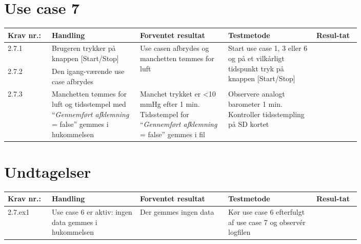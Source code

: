 \section{Use case 7}
						\begin{longtable}{|p{0.1\linewidth}|p{0.2\linewidth}|p{0.2\linewidth}|p{0.2\linewidth}|p{0.1\linewidth}|}
							\hline
							\rowcolor{usDef}
							Krav nr.: & Handling & Forventet resultat & Testmetode & Resul-tat  \\\hline
							2.7.1 & Brugeren trykker på knappen [Start/Stop] & \multirow{2}{\linewidth}{Use casen afbrydes og manchetten tømmes for luft} & \multirow{2}{\linewidth}{Start use case 1, 3 eller 6 og på et vilkårligt tidspunkt tryk på knappen [Start/Stop]} & \multirow{2}{\linewidth}{} \\ \cline{1-2}
							2.7.2 & Den igang-værende use case afbrydes & & & \\ \hline
							2.7.3 & Manchetten tømmes for luft og tidsstempel med “\textit{Gennemført afklemning} = false” gemmes i hukommelsen & Manchet trykket er \textless 10 mmHg efter 1 min. Tidsstempel for  “\textit{Gennemført afklemning} = false” gemmes i fil & Observere analogt barometer 1 min.
							Kontroller tidsstempling på SD kortet & \\ \hline
						\end{longtable}
						
						\pagebreak
					
					\section*{Undtagelser}
						\begin{longtable}{|p{0.1\linewidth}|p{0.2\linewidth}|p{0.2\linewidth}|p{0.2\linewidth}|p{0.1\linewidth}|}
							\hline
							\rowcolor{usDef}
							Krav nr.: & Handling & Forventet resultat & Testmetode & Resul-tat  \\\hline
							2.7.ex1 & Use case 6 er aktiv: ingen data gemmes i hukommelsen & Der gemmes ingen data & Kør use case 6 efterfulgt af use case 7 og observér logfilen & \\ \hline
						\end{longtable}